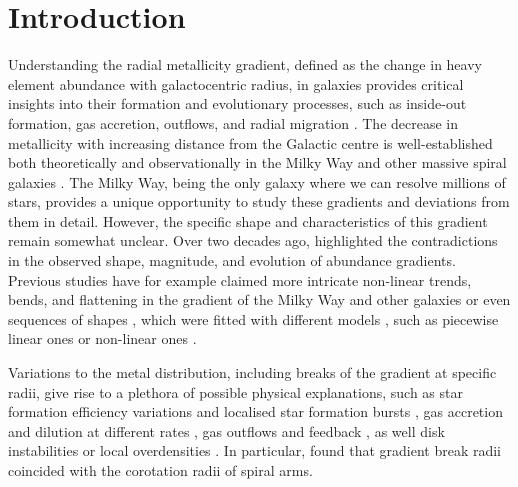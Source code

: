 \documentclass[fleqn,usenatbib]{mnras}
\begin{document}

\section{Introduction}
\label{sec:intro}

Understanding the radial metallicity gradient, defined as the change in heavy element abundance with galactocentric radius, in galaxies provides critical insights into their formation and evolutionary processes, such as inside-out formation, gas accretion, outflows, and radial migration \citep[e.g.][]{Quirk1973, Tinsley1980, Lacey1985, Wyse1989, Kauffman1996, Chiappini1997, Schoenrich2009b, Moran2012, Bird2013}. The decrease in metallicity with increasing distance from the Galactic centre is well-established both theoretically \citep{Larson1976, Tinsley1980, Chiosi1980} and observationally in the Milky Way \citep{Searle1971, Janes1979, Twarog1997} and other massive spiral galaxies \citep[e.g.][]{Tinsley1980, Zaritsky1994,Bresolin2012}. The Milky Way, being the only galaxy where we can resolve millions of stars, provides a unique opportunity to study these gradients and deviations from them in detail. However, the specific shape and characteristics of this gradient remain somewhat unclear. Over two decades ago, \citet{Chiappini2002} highlighted the contradictions in the observed shape, magnitude, and evolution of abundance gradients. Previous studies have for example claimed more intricate non-linear trends, bends, and flattening in the gradient of the Milky Way \citep[e.g.][]{Donor2020} and other galaxies \citep[e.g.][]{Pilyugin2003, Sanchez2014} or even sequences of shapes \citep{Pilyugin2017, Pilyugin2024}, which were fitted with different models \citep{RosalesOrtega2011, Bresolin2012}, such as piecewise linear ones \citep[e.g.][]{SanchezMenguiano2016} or non-linear ones \citep[e.g.][]{Scarano2013}.

Variations to the metal distribution, including breaks of the gradient at specific radii, give rise to a plethora of possible physical explanations, such as star formation efficiency variations and localised star formation bursts \citep{Sanchez2014, SanchezBlazquez2014, Ho2015}, gas accretion and dilution at different rates \citep{Bresolin2012, Sanchez2013, Belfiore2016, SanchezMenguiano2016}, gas outflows and feedback \citep{Lilly2013, Ma2017b}, as well disk instabilities or local overdensities \citep{Grand2016, Ho2017c}. In particular, \citet{Scarano2013} found that gradient break radii coincided with the corotation radii of spiral arms.
\end{document}

